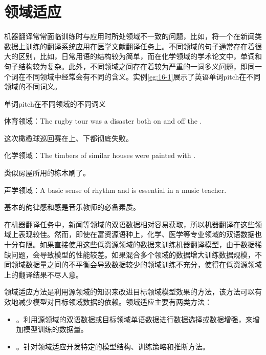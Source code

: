 \section{领域适应}

\parinterval 机器翻译常常面临训练时与应用时所处领域不一致的问题，比如，将一个在新闻类数据上训练的翻译系统应用在医学文献翻译任务上。不同领域的句子通常存在着很大的区别，比如，日常用语的结构较为简单，而在化学领域的学术论文中，单词和句子结构较为复杂。此外，不同领域之间存在着较为严重的一词多义问题，即同一个词在不同领域中经常会有不同的含义。实例\ref{eg:16-1}展示了英语单词pitch在不同领域的不同词义。
\begin{example}
单词pitch在不同领域的不同词义

体育领域：The rugby tour was a disaster both on and off the {}.

\qquad\qquad \hspace{0.8em} 这次橄榄球巡回赛在{}上、{}下都彻底失败。

 化学领域：The timbers of similar houses were painted with {}.

\qquad\qquad \hspace{0.8em} 类似房屋所用的栋木刷了{}。

 声学领域：A basic sense of rhythm and {} is essential in a music teacher.

\qquad\qquad \hspace{0.8em} 基本的韵律感和{}感是音乐教师的必备素质。
\label{eg:16-1}
\end{example}

\parinterval 在机器翻译任务中，新闻等领域的双语数据相对容易获取，所以机器翻译在这些领域上表现较佳。然而，即使在富资源语种上，化学、医学等专业领域的双语数据也十分有限。如果直接使用这些低资源领域的数据来训练机器翻译模型，由于数据稀缺问题，会导致模型的性能较差。如果混合多个领域的数据增大训练数据规模，不同领域数据量之间的不平衡会导致数据较少的领域训练不充分，使得在低资源领域上的翻译结果不尽人意。

\parinterval 领域适应方法是利用源领域的知识来改进目标领域模型效果的方法，该方法可以有效地减少模型对目标领域数据的依赖。领域适应主要有两类方法：

\begin{itemize}
\vspace{0.5em}
\item {\small{}}。利用源领域的双语数据或目标领域单语数据进行数据选择或数据增强，来增加模型训练的数据量。
\vspace{0.5em}
\item {\small{}}。针对领域适应开发特定的模型结构、训练策略和推断方法。
\vspace{0.5em}
\end{itemize}

